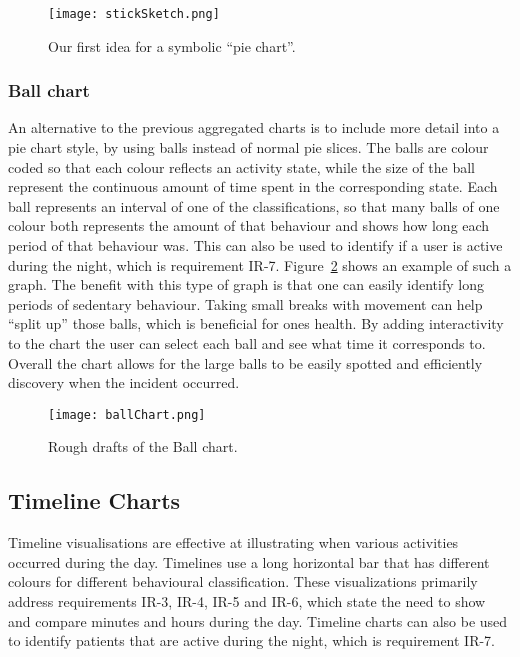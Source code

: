 \begin{figure}[h!]
	\centering
		\texttt{[image: stickSketch.png]}
		\caption[F2 sketch]{Our first idea for a symbolic ``pie chart''.}
		\label{fig:symbolicPie}
\end{figure}

\subsubsection{Ball chart}
An alternative to the previous aggregated charts is to include more detail into a pie chart style, by using balls instead of normal pie slices. The balls are colour coded so that each colour reflects an activity state, while the size of the ball represent the continuous amount of time spent in the corresponding state. Each ball represents an interval of one of the classifications, so that many balls of one colour both represents the amount of that behaviour and shows how long each period of that behaviour was. This can also be used to identify if a user is active during the night, which is requirement IR-7. Figure~\ref{fig:ballChart} shows an example of such a graph. The benefit with this type of graph is that one can easily identify long periods of sedentary behaviour. Taking small breaks with movement can help ``split up'' those balls, which is beneficial for ones health. By adding interactivity to the chart the user can select each ball and see what time it corresponds to. Overall the chart allows for the large balls to be easily spotted and efficiently discovery when the incident occurred.


\begin{figure}[h!]
	\centering
		\texttt{[image: ballChart.png]}
		\caption[F3 sketch]{Rough drafts of the Ball chart.}
		\label{fig:ballChart}
\end{figure}

\subsection{Timeline Charts}
Timeline visualisations are effective at illustrating when various activities occurred during the day. Timelines use a long horizontal bar that has different colours for different behavioural classification. These visualizations primarily address requirements IR-3, IR-4, IR-5 and IR-6, which state the need to show and compare minutes and hours during the day. Timeline charts can also be used to identify patients that are active during the night, which is requirement IR-7.

